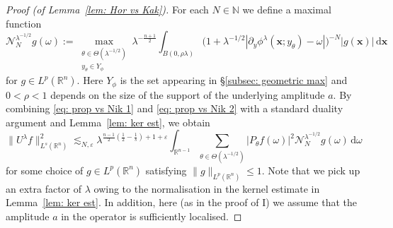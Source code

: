 \documentclass[reqno]{amsart}
\numberwithin{equation}{section}
\newcommand{\N}{\mathbb{N}}
\newcommand{\R}{\mathbb{R}}
\newcommand{\cN}{\mathcal{N}}
\newcommand{\ud}{\mathrm{d}}
\newcommand{\bx}{\mathbf{x}}
\theoremstyle{plain}
\theoremstyle{definition}
\begin{document}
\begin{proof}[Proof (of Lemma~\ref{lem: Hor vs Kak})]
For each $N \in \N$ we define a maximal function
\begin{equation*}
    \cN_N^{\lambda^{-1/2}} g(\omega) := \max_{\substack{\theta \in \Theta(\lambda^{-1/2}) \\ y_{\theta} \in Y_{\phi}}} \lambda^{-\frac{n+1}{2}} \int_{B(0, \rho\lambda)} \big(1 + \lambda^{-1/2}|\partial_y \phi^{\lambda}(\bx;y_{\theta}) - \omega| \big)^{-N} |g(\bx)|\,\ud \bx
\end{equation*}
for $g \in L^p(\R^n)$. Here $Y_{\phi}$ is the set appearing in \S\ref{subsec: geometric max} and $0 < \rho < 1$ depends on the size of the support of the underlying amplitude $a$. By combining \eqref{eq: prop vs Nik 1} and \eqref{eq: prop vs Nik 2} with a standard duality argument and Lemma~\ref{lem: ker est}, we obtain
\begin{equation}\label{eq: prop vs Nik 3}
    \|U^{\lambda}f\|_{L^s(\R^n)}^2 \lesssim_{N,\varepsilon}  \lambda^{\frac{n-1}{2}(\frac{1}{2} - \frac{1}{s}) + 1 + \varepsilon} \int_{\R^{n-1}} \sum_{\theta \in \Theta(\lambda^{-1/2})} |P_{\theta}f(\omega)|^2  \cN_N^{\lambda^{-1/2}} g(\omega)\,\ud \omega
\end{equation}
for some choice of $g \in L^p(\R^n)$ satisfying $\|g\|_{L^p(\R^n)} \leq 1$. Note that we pick up an extra factor of $\lambda$ owing to the normalisation in the kernel estimate in Lemma~\ref{lem: ker est}. In addition, here (as in the proof of I) we assume that the amplitude $a$ in the operator is sufficiently localised.


\end{proof}
\end{document}
